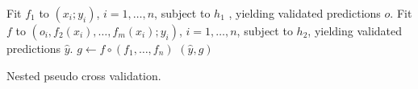 \begin{algorithm}
    \begin{algorithmic}[1]
            \State Fit $f_1$ to $(x_i; y_i)$, $i = 1, \ldots, n$, subject to $h_1$ , yielding 
                validated predictions $o$.
            \State Fit $f$ to $(o_i, f_2(x_i), \ldots, f_m(x_i); y_i)$, 
                $i = 1, \ldots, n$, subject to $h_2$, yielding validated predictions $\hat{y}$.
            \State $g \gets f \circ (f_1, \ldots, f_n)$
            \State \Return $(\hat{y}, g)$
        \EndFunction
    \end{algorithmic}
    \caption{Nested pseudo cross validation.} \label{alg:nested-pcv}
\end{algorithm}